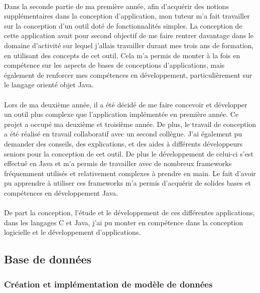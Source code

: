 \documentclass[12pt,a4paper]{report}
\begin{document}
\paragraph*{}Dans la seconde partie de ma première année, afin d’acquérir des notions supplémentaires dans la conception d’application, mon tuteur m’a fait travailler sur la conception d’un outil doté de fonctionnalités simples. La conception de cette application avait pour second objectif de me faire rentrer davantage dans le domaine d’activité sur lequel j’allais travailler durant mes trois ans de formation, en utilisant des concepts de cet outil. Cela m’a permis de monter à la fois en compétence sur les aspects de bases de conceptions d’applications, mais également de renforcer mes compétences en développement, particulièrement sur le langage orienté objet Java.
\paragraph*{}Lors de ma deuxième année, il a été décidé de me faire concevoir et développer un outil plus complexe que l’application implémentée en première année. Ce projet a occupé ma deuxième et troisième année. De plus, le travail de conception a été réalisé en travail collaboratif avec un second collègue. J’ai également pu demander des conseils, des explications, et des aides à différents développeurs seniors pour la conception de cet outil. De plus le développement de celui-ci s’est effectué en Java et m’a permis de travailler avec de nombreux frameworks fréquemment utilisés et relativement complexes à prendre en main. Le fait d’avoir pu apprendre à utiliser ces frameworks m’a permis d’acquérir de solides bases et compétences en développement Java.
\paragraph*{}De part la conception, l’étude et le développement de ces différentes applications, dans les langages C et Java, j’ai pu monter en compétence dans la conception logicielle et le développement d’applications.\\

\subsection{Base de données}
\subsubsection{Création et implémentation de modèle de données}
\end{document}

